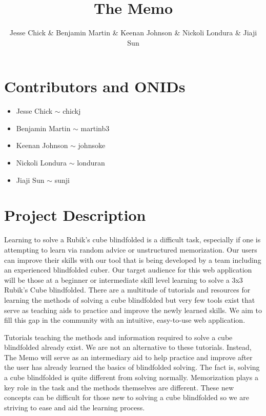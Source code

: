 \documentclass[12pt]{article}
\title{The Memo}
\author{Jesse Chick \& Benjamin Martin \& Keenan Johnson \& Nickoli Londura \& Jiaji Sun}
\begin{document}
\maketitle
\tableofcontents

\section{Contributors and ONIDs}
\begin{itemize}
	\item Jesse Chick $\sim$ chickj
	\item Benjamin Martin $\sim$ martinb3
	\item Keenan Johnson $\sim$ johnsoke
	\item Nickoli Londura $\sim$ londuran
	\item Jiaji Sun $\sim$ sunji
\end{itemize}

\section{Project Description}
\par
Learning to solve a Rubik’s cube blindfolded is a difficult task, especially if one is attempting to learn via random advice or unstructured memorization. Our users can improve their skills with our tool that is being developed by a team including an experienced blindfolded cuber. Our target audience for this web application will be those at a beginner or intermediate skill level learning to solve a 3x3 Rubik’s Cube blindfolded. There are a multitude of tutorials and resources for learning the methods of solving a cube blindfolded but very few tools exist that serve as teaching aids to practice and improve the newly learned skills. We aim to fill this gap in the community with an intuitive, easy-to-use web application.
\par 
Tutorials teaching the methods and information required to solve a cube blindfolded already exist. We are not an alternative to these tutorials. Instead, The Memo will serve as an intermediary aid to help practice and improve after the user has already learned the basics of blindfolded solving. The fact is, solving a cube blindfolded is quite different from solving normally. Memorization plays a key role in the task and the methods themselves are different. These new concepts can be difficult for those new to solving a cube blindfolded so we are striving to ease and aid the learning process.
\end{document}
